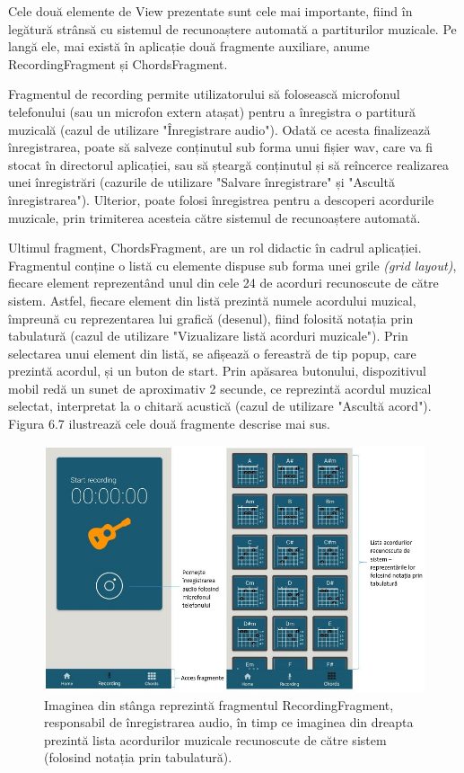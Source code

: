 \documentclass[a4paper,12pt]{report}
\begin{document}
Cele două elemente de View prezentate sunt cele mai importante, 
fiind în legătură strânsă cu sistemul de recunoaștere automată a 
partiturilor muzicale. Pe langă ele, mai există în aplicație 
două fragmente auxiliare, anume RecordingFragment și ChordsFragment.

Fragmentul de recording permite utilizatorului să folosească 
microfonul telefonului (sau un microfon extern atașat) pentru 
a înregistra o partitură muzicală (cazul de 
utilizare "Înregistrare audio"). Odată ce acesta 
finalizează înregistrarea, poate să salveze conținutul sub 
forma unui fișier wav, care va fi stocat în directorul 
aplicației, sau să șteargă conținutul și să reîncerce 
realizarea unei înregistrări (cazurile de utilizare "Salvare înregistrare" 
și "Ascultă înregistrarea"). Ulterior, poate folosi 
înregistrea pentru a descoperi acordurile muzicale, prin trimiterea 
acesteia către sistemul de recunoaștere automată.

Ultimul fragment, ChordsFragment, are un 
rol didactic în cadrul aplicației. Fragmentul conține 
o listă cu elemente dispuse sub forma unei grile \emph{(grid layout)},
fiecare element reprezentând unul din cele 24 de acorduri 
recunoscute de către sistem. Astfel, fiecare element din listă prezintă 
numele acordului muzical, împreună cu reprezentarea lui 
grafică (desenul), fiind folosită notația prin tabulatură
(cazul de utilizare "Vizualizare listă acorduri 
muzicale"). Prin selectarea unui element 
din listă, se afișează o fereastră 
de tip popup, care prezintă acordul, și un buton 
de start. Prin apăsarea butonului, dispozitivul mobil 
redă un sunet de aproximativ 2 secunde, ce reprezintă acordul 
muzical selectat, interpretat la o chitară acustică (cazul 
de utilizare "Ascultă acord").
Figura 6.7 ilustrează cele două fragmente descrise mai sus.
\begin{figure}[h!]
    \centering
    \includegraphics[width=15.8cm]{..//resources//images//mobile_2_v2.jpg} 
    \caption{Imaginea din stânga reprezintă fragmentul RecordingFragment, 
    responsabil de înregistrarea audio, în timp ce imaginea din dreapta 
    prezintă lista acordurilor muzicale recunoscute de către sistem 
    (folosind notația prin tabulatură).}
\end{figure}
\end{document}

